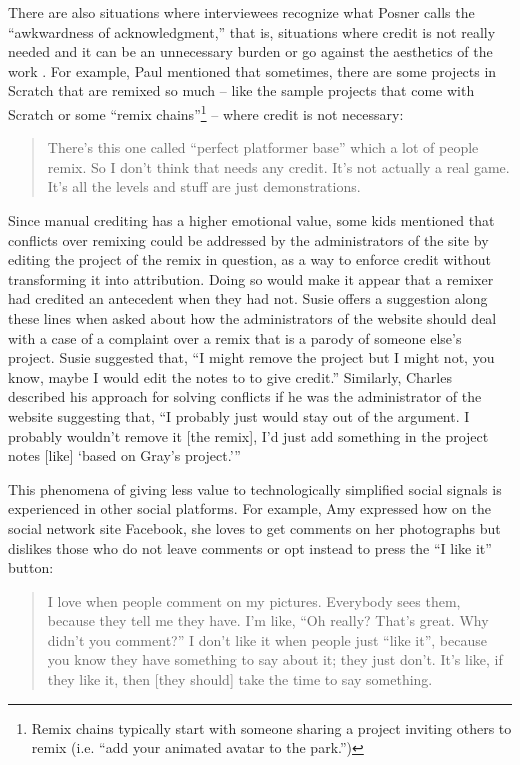 There are also situations where interviewees recognize what Posner
calls the ``awkwardness of acknowledgment,'' that is, situations where
credit is not really needed and it can be an unnecessary burden or go
against the aesthetics of the work \cite{posner_little_2007}. For
example, Paul mentioned that sometimes, there are some projects in
Scratch that are remixed so much -- like the sample projects that come
with Scratch or some ``remix chains''\footnote{Remix chains typically
  start with someone sharing a project inviting others to remix 
  (i.e. ``add your animated avatar to the park.'')} -- where credit is not
necessary:

\begin{quote}
  There's this one called ``perfect platformer base'' which a lot of
  people remix. So I don't think that needs any credit. It's not
  actually a real game. It's all the levels and stuff are just
  demonstrations.
\end{quote}

Since manual crediting has a higher emotional value, some kids
mentioned that conflicts over remixing could be addressed by the
administrators of the site by editing the project of the remix in
question, as a way to enforce credit without transforming it into
attribution. Doing so would make it appear that a remixer had credited
an antecedent when they had not. Susie offers a suggestion along these
lines when asked about how the administrators of the website should
deal with a case of a complaint over a remix that is a parody of
someone else's project. Susie suggested that, ``I might remove the
project but I might not, you know, maybe I would edit the notes to to
give credit.''  Similarly, Charles described his approach for solving
conflicts if he was the administrator of the website suggesting that,
``I probably just would stay out of the argument.  I probably wouldn't
remove it [the remix], I'd just add something in the project notes
[like] `based on Gray's project.'''

This phenomena of giving less value to technologically simplified
social signals is experienced in other social platforms. For example,
Amy expressed how on the social network site Facebook, she loves to
get comments on her photographs but dislikes those who do not leave
comments or opt instead to press the ``I like it'' button:

\begin{quote}
  I love when people comment on my pictures.  Everybody sees them,
  because they tell me they have.  I'm like, ``Oh really?  That's
  great.  Why didn't you comment?'' I don't like it when people just
  ``like it'', because you know they have something to say about it;
  they just don't.  It's like, if they like it, then [they should]
  take the time to say something.
\end{quote}


